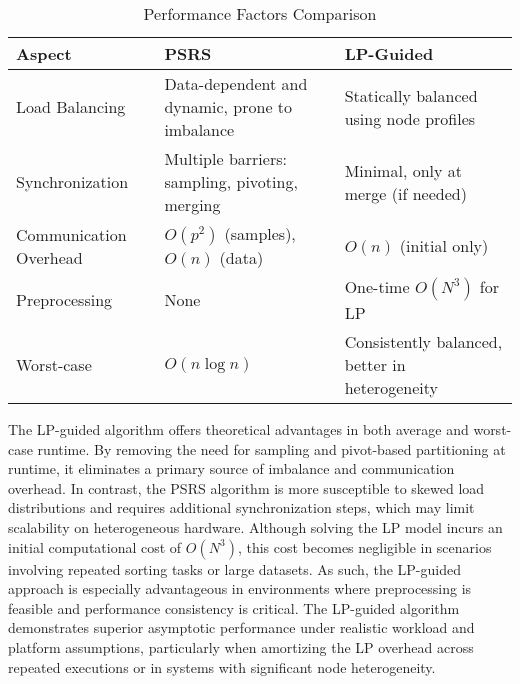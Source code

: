 \documentclass[]{interact}
\theoremstyle{plain}
\theoremstyle{definition}
\theoremstyle{remark}
\begin{document}
    

    


\begin{table}[h]
\footnotesize
\renewcommand{\arraystretch}{1.5} %
\begin{tabular}{|p{3cm}|p{5cm}|p{5cm}|}
\hline
\textbf{Aspect} & \textbf{PSRS} & \textbf{LP-Guided} \\
\hline
Load Balancing & Data-dependent and dynamic, prone to imbalance & Statically balanced using node profiles \\
\hline
Synchronization & Multiple barriers: sampling, pivoting, merging & Minimal, only at merge (if needed) \\
\hline
Communication Overhead & $O(p^2)$ (samples), $O(n)$ (data) & $O(n)$ (initial only) \\
\hline
Preprocessing & None & One-time $O(N^3)$ for LP \\
\hline
Worst-case & $O(n \log n)$ & Consistently balanced, better in heterogeneity \\
\hline
\end{tabular}
\caption{Performance Factors Comparison}
\end{table}



The LP-guided algorithm offers theoretical advantages in both average and worst-case runtime. By removing the need for sampling and pivot-based partitioning at runtime, it eliminates a primary source of imbalance and communication overhead. In contrast, the PSRS algorithm is more susceptible to skewed load distributions and requires additional synchronization steps, which may limit scalability on heterogeneous hardware. Although solving the LP model incurs an initial computational cost of $O(N^3)$, this cost becomes negligible in scenarios involving repeated sorting tasks or large datasets. As such, the LP-guided approach is especially advantageous in environments where preprocessing is feasible and performance consistency is critical. The LP-guided algorithm demonstrates superior asymptotic performance under realistic workload and platform assumptions, particularly when amortizing the LP overhead across repeated executions or in systems with significant node heterogeneity.
\end{document}
